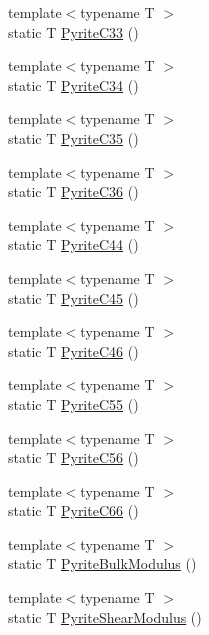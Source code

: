 \begin{DoxyCompactItemize}
\item 
{\footnotesize template$<$typename T $>$ }\\static T \mbox{\hyperlink{namespacempc_1_1data_aa3a0ad6fceed6c0f6b17c7fe16509cdf}{Pyrite\+C33}} ()
\item 
{\footnotesize template$<$typename T $>$ }\\static T \mbox{\hyperlink{namespacempc_1_1data_a8c169a418835af72e80eafff06c1ad49}{Pyrite\+C34}} ()
\item 
{\footnotesize template$<$typename T $>$ }\\static T \mbox{\hyperlink{namespacempc_1_1data_afce8e16e07e2c9c3f583d7d217ba2d4d}{Pyrite\+C35}} ()
\item 
{\footnotesize template$<$typename T $>$ }\\static T \mbox{\hyperlink{namespacempc_1_1data_adbd25b0d47394d2ddbc235317a4ba9a4}{Pyrite\+C36}} ()
\item 
{\footnotesize template$<$typename T $>$ }\\static T \mbox{\hyperlink{namespacempc_1_1data_a4a06e515fed13419d31b132550e29f3d}{Pyrite\+C44}} ()
\item 
{\footnotesize template$<$typename T $>$ }\\static T \mbox{\hyperlink{namespacempc_1_1data_a59b9ba769e4fecfeb985e7692370c559}{Pyrite\+C45}} ()
\item 
{\footnotesize template$<$typename T $>$ }\\static T \mbox{\hyperlink{namespacempc_1_1data_a30e6a7eb13c51ce9b2ab13a766df352e}{Pyrite\+C46}} ()
\item 
{\footnotesize template$<$typename T $>$ }\\static T \mbox{\hyperlink{namespacempc_1_1data_a4ca1154d37df73cd435286c05b0d9f0c}{Pyrite\+C55}} ()
\item 
{\footnotesize template$<$typename T $>$ }\\static T \mbox{\hyperlink{namespacempc_1_1data_a768175a46d8188c1d8f998db8ed3c1d6}{Pyrite\+C56}} ()
\item 
{\footnotesize template$<$typename T $>$ }\\static T \mbox{\hyperlink{namespacempc_1_1data_a42543c2f733d47807d60d92fb18bfab3}{Pyrite\+C66}} ()
\item 
{\footnotesize template$<$typename T $>$ }\\static T \mbox{\hyperlink{namespacempc_1_1data_a244b9ff47f7a4c4cb81c34fa5e6f3111}{Pyrite\+Bulk\+Modulus}} ()
\item 
{\footnotesize template$<$typename T $>$ }\\static T \mbox{\hyperlink{namespacempc_1_1data_adf03f9645c0a6928fa9c018215058b2a}{Pyrite\+Shear\+Modulus}} ()

\end{DoxyCompactItemize}
